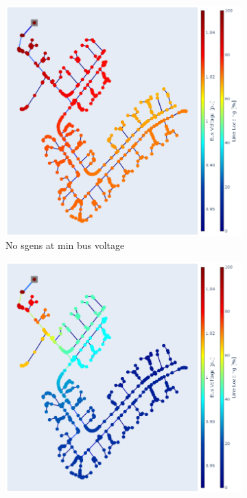 \documentclass[a4paper,10pt]{report}
\begin{document}
\newpage
\begin{figure}
	\centering
	\begin{subfigure}[b]{0.475\textwidth}
		\centering
		\includegraphics[width=\textwidth]{hosting_cap_min_empty}
		\caption[]%
		{{\small No sgens at min bus voltage}}    
		\label{fig:mean and std of net14}
	\end{subfigure}
	\hfill
	\begin{subfigure}[b]{0.475\textwidth}  
		\centering 
		\includegraphics[width=\textwidth]{hosting_cap_min_full}

\end{subfigure}
\end{figure}
\end{document}
